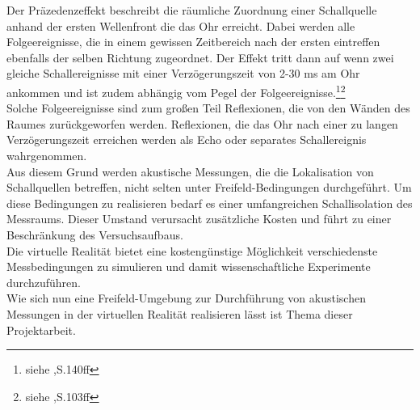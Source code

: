

Der Präzedenzeffekt beschreibt die räumliche Zuordnung einer Schallquelle anhand der ersten Wellenfront die das Ohr erreicht. Dabei werden alle Folgeereignisse, die in einem gewissen Zeitbereich nach der ersten eintreffen ebenfalls der selben Richtung zugeordnet. Der Effekt tritt dann auf wenn zwei gleiche Schallereignisse mit einer Verzögerungszeit von 2-30 ms am Ohr ankommen und ist zudem abhängig vom Pegel der Folgeereignisse.\footnote{siehe \cite{ency},S.140ff}\footnote{siehe \cite{handbuch},S.103ff}\\
Solche Folgeereignisse sind zum großen Teil Reflexionen, die von den Wänden des Raumes zurückgeworfen werden. Reflexionen, die das Ohr nach einer zu langen Verzögerungszeit erreichen werden als Echo oder separates Schallereignis wahrgenommen.\\
Aus diesem Grund werden akustische Messungen, die die Lokalisation von Schallquellen betreffen, nicht selten unter Freifeld-Bedingungen durchgeführt.
Um diese Bedingungen zu realisieren bedarf es einer umfangreichen Schallisolation des Messraums. Dieser Umstand verursacht zusätzliche Kosten und führt zu einer Beschränkung des Versuchsaufbaus.\\
Die virtuelle Realität bietet eine kostengünstige Möglichkeit verschiedenste Messbedingungen zu simulieren und damit wissenschaftliche Experimente durchzuführen.\\
Wie sich nun eine Freifeld-Umgebung zur Durchführung von akustischen Messungen in der virtuellen Realität realisieren lässt ist Thema dieser Projektarbeit. 


